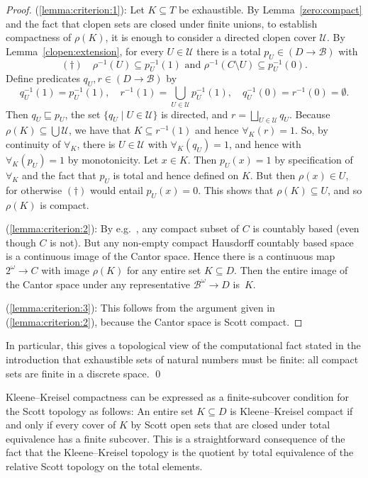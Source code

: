 \documentclass{LMCS}
\newcommand{\myomega}{\omega}
\newcommand{\licsmath}[1]{\[ #1 \]}
\newcommand{\Bool}{2}\newcommand{\Sierp}{\mathcal{S}}
\newcommand{\pBool}{\mathcal{B}}
\newcommand{\True}{1}\newcommand{\False}{0}\newcommand{\domain}[1]{{\D_{#1}}}
\newcommand{\qq}{\rho}
\newcommand{\D}{D}
\newcommand{\C}{C}
\newcommand{\T}{T}
\begin{document}
\begin{proof}
  (\ref{lemma:criterion:1}): Let $K \subseteq \T$ be exhaustible. By
  Lemma~\ref{zero:compact} and the fact that clopen sets are closed
  under finite unions, to establish compactness of $\rho(K)$, it is
  enough to consider a directed clopen cover $\mathcal{U}$. By
  Lemma~\ref{clopen:extension}, for every $U \in \mathcal{U}$ there is
  a total $p_U \in (\D \to \pBool)$ with
\licsmath{(\dagger) \quad \text{$\qq^{-1}(U) \subseteq
      p_U^{-1}(\True)$ and $\qq^{-1}(\C \setminus U) \subseteq
      p_U^{-1}(\False)$.}}
Define predicates $q_U, r \in (\D \to \pBool)$ by
  \[ q_U^{-1}(\True)=p_U^{-1}(\True), \quad
    r^{-1}(\True)=\bigcup_{U \in \mathcal{U}} p_U^{-1}(\True), \quad
    q_U^{-1}(\False)=r^{-1}(\False)=\emptyset.
  \]  
  Then $q_U \sqsubseteq p_U$, the set $\{ q_U \mid U \in
  \mathcal{U}\}$ is directed, and $r=\bigsqcup_{U \in \mathcal{U}}
  q_U$. Because $\rho(K) \subseteq \bigcup \mathcal{U}$, we have that
  $K \subseteq r^{-1}(\True)$ and hence $\forall_K(r)=\True$. So, by
  continuity of $\forall_K$, there is $U \in \mathcal{U}$ with
  $\forall_K(q_U)=\True$, and hence with $\forall_K(p_U)=\True$ by
  monotonicity.  Let $x \in K$. Then $p_U(x)=\True$ by specification
  of~$\forall_K$ and the fact that $p_U$ is total and hence defined on
  $K$.  But then $\qq(x) \in U$, for otherwise $(\dagger)$ would
  entail $p_U(x)=\False$.  This shows that $\qq(K) \subseteq U$, and
  so $\qq(K)$ is compact.

\medskip

(\ref{lemma:criterion:2}): By e.g.\ \cite{escardo:lawson:simpson}, any
compact subset of $C$ is countably based (even though $C$ is not). But
any non-empty compact Hausdorff countably based space is a continuous
image of the Cantor space. Hence there is a continuous map
$\Bool^\omega \to C$ with image $\rho(K)$ for any entire set $K
\subseteq D$. Then the entire image of the Cantor space under any
representative $\pBool^\myomega \to D$ is~$K$.

(\ref{lemma:criterion:3}): This follows from the argument given in
(\ref{lemma:criterion:2}), because the Cantor space is Scott compact.
\end{proof}

\begin{rem} \label{introduction}
In particular, this gives a topological view of the computational fact
stated in the introduction that exhaustible sets of natural numbers
must be finite: all compact sets are finite in a discrete space. \qed
\end{rem}
Kleene--Kreisel compactness can be expressed as a finite-subcover
condition for the Scott topology as follows: An entire set $K
\subseteq D$ is Kleene--Kreisel compact if and only if every cover of
$K$ by Scott open sets that are closed under total equivalence has a
finite subcover.  This is a straightforward consequence of the fact
that the Kleene--Kreisel topology is the quotient by total equivalence
of the relative Scott topology on the total elements.
\end{document}

